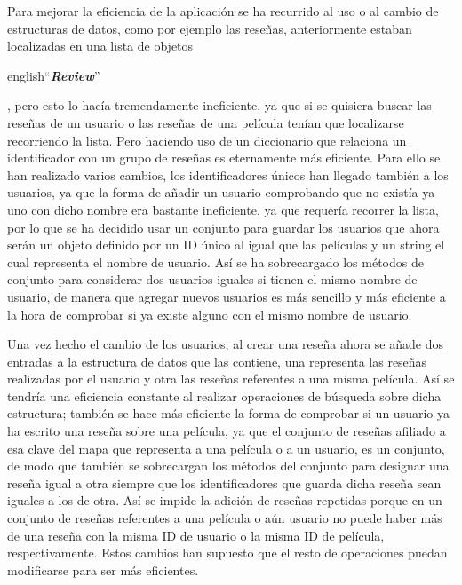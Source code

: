 Para mejorar la eficiencia de la aplicación se ha recurrido al uso o al cambio de estructuras de datos, como por 
ejemplo las reseñas, anteriormente estaban localizadas en una lista de objetos 
\begin{otherlanguage} {english}``\textit{\textbf{Review}}''\end{otherlanguage}, 
pero esto lo hacía tremendamente ineficiente, ya que si se quisiera buscar las reseñas de un usuario o las reseñas 
de una película tenían que localizarse recorriendo la lista. Pero haciendo uso de un diccionario\cite{OaksJava} que 
relaciona un identificador con un grupo de reseñas es eternamente más eficiente. Para ello se han realizado varios 
cambios, los identificadores únicos han llegado también a los usuarios, ya que la forma de añadir un usuario 
comprobando que no existía ya uno con dicho nombre era bastante ineficiente, ya que requería recorrer la lista, por 
lo que se ha decidido usar un conjunto para guardar los usuarios que ahora serán un objeto definido por un ID único 
al igual que las películas y un string el cual representa el nombre de usuario. Así se ha sobrecargado los métodos 
de conjunto\cite{BlochEffective} para considerar dos usuarios iguales si tienen el mismo nombre de usuario, de manera 
que agregar nuevos usuarios es más sencillo y más eficiente a la hora de comprobar si ya existe alguno con el mismo 
nombre de usuario.

Una vez hecho el cambio de los usuarios, al crear una reseña ahora se añade dos entradas a la estructura de datos 
que las contiene, una representa las reseñas realizadas por el usuario y otra las reseñas referentes a una misma 
película. Así se tendría una eficiencia constante al realizar operaciones de búsqueda sobre dicha 
estructura\cite{LaforeData}; también se hace más eficiente la forma de comprobar si un usuario ya ha escrito una 
reseña sobre una película, ya que el conjunto de reseñas afiliado a esa clave del mapa que representa a una película o 
a un usuario, es un conjunto, de modo que también se sobrecargan los métodos del conjunto para designar una reseña 
igual a otra siempre que los identificadores que guarda dicha reseña sean iguales a los de otra. Así se impide la 
adición de reseñas repetidas porque en un conjunto de reseñas referentes a una película o aún usuario no puede haber 
más de una reseña con la misma ID de usuario o la misma ID de película, respectivamente. Estos cambios han supuesto 
que el resto de operaciones puedan modificarse para ser más eficientes.

